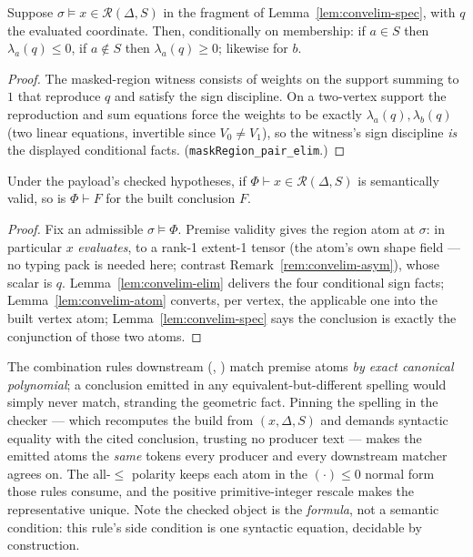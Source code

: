 \begin{blemma}
\label{lem:convelim-elim}
Suppose $\sigma \models x \in \mathcal{R}(\Delta, S)$ in the fragment of
Lemma~\ref{lem:convelim-spec}, with $q$ the evaluated coordinate. Then,
conditionally on membership: if $a \in S$ then $\lambda_a(q) \leq 0$, if
$a \notin S$ then $\lambda_a(q) \geq 0$; likewise for $b$.
\end{blemma}
\begin{proof}
The masked-region witness consists of weights on the support summing to
$1$ that reproduce $q$ and satisfy the sign discipline. On a two-vertex
support the reproduction and sum equations force the weights to be
exactly $\lambda_a(q), \lambda_b(q)$ (two linear equations, invertible
since $V_0 \neq V_1$), so the witness's sign discipline \emph{is} the
displayed conditional facts. (\texttt{maskRegion\_pair\_elim}.)
\end{proof}

\begin{bthm}\label{thm:convelim-sound}
Under the payload's checked hypotheses, if
$\Phi \vdash x \in \mathcal{R}(\Delta, S)$ is semantically valid, so is
$\Phi \vdash F$ for the built conclusion $F$.
\end{bthm}
\begin{proof}
Fix an admissible $\sigma \models \Phi$. Premise validity gives the
region atom at $\sigma$: in particular $x$ \emph{evaluates}, to a rank-1
extent-1 tensor (the atom's own shape field --- no typing pack is needed
here; contrast Remark~\ref{rem:convelim-asym}), whose scalar is $q$.
Lemma~\ref{lem:convelim-elim} delivers the four conditional sign facts;
Lemma~\ref{lem:convelim-atom} converts, per vertex, the applicable one
into the built vertex atom; Lemma~\ref{lem:convelim-spec} says the
conclusion is exactly the conjunction of those two atoms.
\end{proof}

\begin{bremark}\label{rem:convelim-canon}
The combination rules downstream (, )
match premise atoms \emph{by exact canonical polynomial}; a conclusion
emitted in any equivalent-but-different spelling would simply never
match, stranding the geometric fact. Pinning the spelling in the checker
--- which recomputes the build from $(x, \Delta, S)$ and demands
syntactic equality with the cited conclusion, trusting no producer text
--- makes the emitted atoms the \emph{same} tokens every producer and
every downstream matcher agrees on. The all-$\leq$ polarity keeps each
atom in the $(\cdot) \leq 0$ normal form those rules consume, and the
positive primitive-integer rescale makes the representative unique. Note
the checked object is the \emph{formula}, not a semantic condition: this
rule's side condition is one syntactic equation, decidable by
construction.
\end{bremark}

